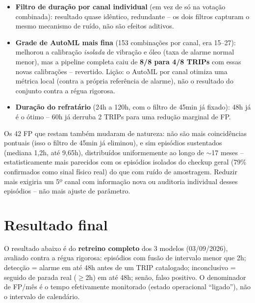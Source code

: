 \documentclass[11pt,a4paper]{article}
\begin{document}
\begin{itemize}
  \item \textbf{Filtro de duração por canal individual} (em vez de só
    na votação combinada): resultado quase idêntico, redundante --
    os dois filtros capturam o mesmo mecanismo de ruído, não são
    efeitos aditivos.
  \item \textbf{Grade de AutoML mais fina} (153 combinações por
    canal, era 15--27): melhorou a calibração \emph{isolada} de
    vibração e óleo (taxa de alarme normal menor), mas a pipeline
    completa caiu de \textbf{8/8 para 4/8 TRIPs} com essas novas
    calibrações -- revertido. Lição: o AutoML por canal otimiza uma
    métrica local (contra a própria referência de alarme), não o
    resultado do conjunto contra a régua rigorosa.
  \item \textbf{Duração do refratário} (24h a 120h, com o filtro de
    45min já fixado): 48h já é o ótimo -- 60h já derruba 2 TRIPs para
    uma redução marginal de FP.
\end{itemize}

Os 42 FP que restam também mudaram de natureza: não são mais
coincidências pontuais (isso o filtro de 45min já eliminou), e sim
episódios sustentados (mediana 1,2h, até 9,65h), distribuídos
uniformemente ao longo de $\sim$17 meses -- estatisticamente mais
parecidos com os episódios isolados do checkup geral (79\%
confirmados como sinal físico real) do que com ruído de amostragem.
Reduzir mais exigiria um 5º canal com informação nova ou auditoria
individual desses episódios -- não mais ajuste de parâmetro.


\noindent{}

\section{Resultado final}
\label{sec:resultado}

O resultado abaixo é do \textbf{retreino completo} dos 3 modelos
(03/09/2026), avaliado contra a régua rigorosa: episódios com
fusão de intervalo menor que 2h; detecção = alarme em até 48h antes
de um TRIP catalogado; inconclusivo = seguido de parada real
($\geq$2h) em até 48h; senão, falso positivo. O denominador de
FP/mês é o tempo efetivamente monitorado (estado operacional
``ligado''), não o intervalo de calendário.
\end{document}
